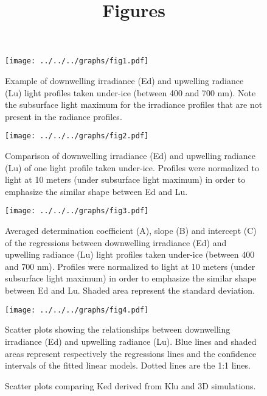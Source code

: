 \documentclass[12pt,a4paper]{scrartcl}
\title{Figures}
\date{}
\begin{document}
    \maketitle

     \begin{figure}[ht]
         \centering
         \texttt{[image: ../../../graphs/fig1.pdf]}
         \caption{Example of downwelling irradiance (Ed) and upwelling radiance (Lu) light profiles taken under-ice (between 400 and 700 nm). Note the subsurface light maximum for the irradiance profiles that are not present in the radiance profiles.}
     \end{figure}

    \clearpage
    \newpage

    \begin{figure}[ht]
        \centering
        \texttt{[image: ../../../graphs/fig2.pdf]}
        \caption{Comparison of downwelling irradiance (Ed) and upwelling radiance (Lu) of one light profile taken under-ice. Profiles were normalized to light at 10 meters (under subsurface light maximum) in order to emphasize the similar shape between Ed and Lu.}
    \end{figure}

    \clearpage
    \newpage

    \begin{figure}[ht]
        \centering
        \texttt{[image: ../../../graphs/fig3.pdf]}
        \caption{Averaged determination coefficient (A),  slope (B) and intercept (C) of the regressions between downwelling irradiance (Ed) and upwelling radiance (Lu) light profiles taken under-ice (between 400 and 700 nm). Profiles were normalized to light at 10 meters (under subsurface light maximum) in order to emphasize the similar shape between Ed and Lu. Shaded area represent the standard deviation.}
    \end{figure}

    \clearpage
    \newpage

    \begin{figure}[ht]
        \centering
        \texttt{[image: ../../../graphs/fig4.pdf]}
        \caption{Scatter plots showing the relationships between downwelling irradiance (Ed) and upwelling radiance (Lu). Blue lines and shaded areas represent respectively the regressions lines and the confidence intervals of the fitted linear models. Dotted lines are the 1:1 lines.}
    \end{figure}

    \clearpage
    \newpage

    \begin{figure}[ht]
        \centering
        \caption{Scatter plots comparing Ked derived from Klu and 3D simulations.}
    \end{figure}

    
\end{document}
